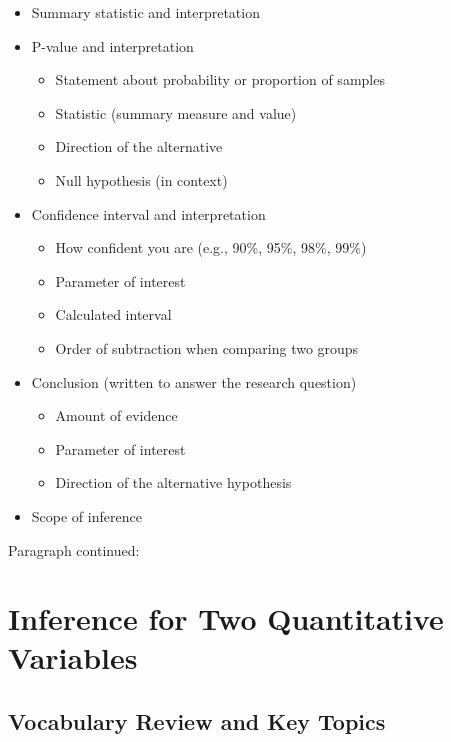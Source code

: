 \documentclass[
]{report}
\begin{document}
\begin{itemize}
\item
  Summary statistic and interpretation
\item
  P-value and interpretation

  \begin{itemize}
  \item
    Statement about probability or proportion of samples
  \item
    Statistic (summary measure and value)
  \item
    Direction of the alternative
  \item
    Null hypothesis (in context)
  \end{itemize}
\item
  Confidence interval and interpretation

  \begin{itemize}
  \item
    How confident you are (e.g., 90\%, 95\%, 98\%, 99\%)
  \item
    Parameter of interest
  \item
    Calculated interval
  \item
    Order of subtraction when comparing two groups
  \end{itemize}
\item
  Conclusion (written to answer the research question)

  \begin{itemize}
  \item
    Amount of evidence
  \item
    Parameter of interest
  \item
    Direction of the alternative hypothesis
  \end{itemize}
\item
  Scope of inference
\end{itemize}

\newpage

Paragraph continued:

\newpage

\chapter{Inference for Two Quantitative Variables}\label{inference-for-two-quantitative-variables}

\section{Vocabulary Review and Key Topics}\label{vocabulary-review-and-key-topics-10}
\end{document}
